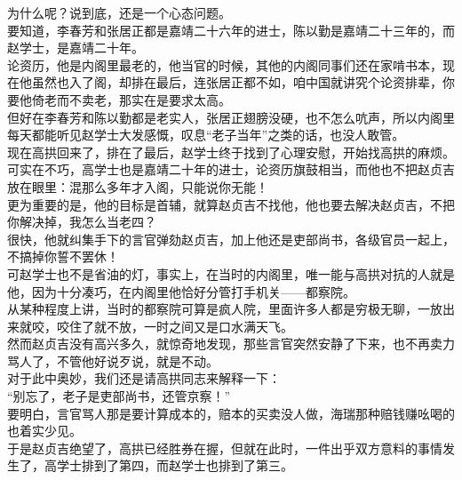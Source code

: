 \begin{multicols}{\theparacolNo}
为什么呢？说到底，还是一个心态问题。\\

要知道，李春芳和张居正都是嘉靖二十六年的进士，陈以勤是嘉靖二十三年的，而赵学士，是嘉靖二十年。\\

论资历，他是内阁里最老的，他当官的时候，其他的内阁同事们还在家啃书本，现在他虽然也入了阁，却排在最后，连张居正都不如，咱中国就讲究个论资排辈，你要他倚老而不卖老，那实在是要求太高。\\

但好在李春芳和陈以勤都是老实人，张居正翅膀没硬，也不怎么吭声，所以内阁里每天都能听见赵学士大发感慨，叹息“老子当年”之类的话，也没人敢管。\\

现在高拱回来了，排在了最后，赵学士终于找到了心理安慰，开始找高拱的麻烦。\\

可实在不巧，高学士也是嘉靖二十年的进士，论资历旗鼓相当，而他也不把赵贞吉放在眼里：混那么多年才入阁，只能说你无能！\\

更为重要的是，他的目标是首辅，就算赵贞吉不找他，他也要去解决赵贞吉，不把你解决掉，我怎么当老四？\\

很快，他就纠集手下的言官弹劾赵贞吉，加上他还是吏部尚书，各级官员一起上，不搞掉你誓不罢休！\\

可赵学士也不是省油的灯，事实上，在当时的内阁里，唯一能与高拱对抗的人就是他，因为十分凑巧，在内阁里他恰好分管打手机关——都察院。\\

从某种程度上讲，当时的都察院可算是疯人院，里面许多人都是穷极无聊，一放出来就咬，咬住了就不放，一时之间又是口水满天飞。\\

然而赵贞吉没有高兴多久，就惊奇地发现，那些言官突然安静了下来，也不再卖力骂人了，不管他好说歹说，就是不动。\\

对于此中奥妙，我们还是请高拱同志来解释一下：\\

“别忘了，老子是吏部尚书，还管京察！”\\

要明白，言官骂人那是要计算成本的，赔本的买卖没人做，海瑞那种赔钱赚吆喝的也着实少见。\\

于是赵贞吉绝望了，高拱已经胜券在握，但就在此时，一件出乎双方意料的事情发生了，高学士排到了第四，而赵学士也排到了第三。\\


\end{multicols}
